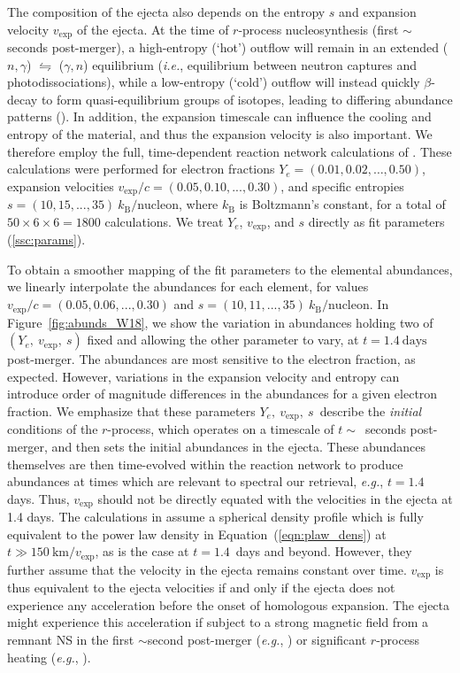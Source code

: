 \documentclass[twocolumn, twocolappendix]{aastex63}
\def\eg{{\it e.g.}}
\def\ie{{\it i.e.}}
\begin{document}
The composition of the ejecta also depends on the entropy $s$ and expansion velocity $v_{\mathrm{exp}}$ of the ejecta. At the time of $r$-process nucleosynthesis (first $\sim$ seconds post-merger), a high-entropy (`hot') outflow will remain in an extended ($n, \gamma$) $\leftrightharpoons$ ($\gamma, n$) equilibrium (\ie, equilibrium between neutron captures and photodissociations), while a low-entropy (`cold') outflow will instead quickly $\beta$-decay to form quasi-equilibrium groups of isotopes, leading to differing abundance patterns (\citealt{cowan21, vassh21}). In addition, the expansion timescale can influence the cooling and entropy of the material, and thus the expansion velocity is also important. We therefore employ the full, time-dependent reaction network calculations of \cite{wanajo18}. These calculations were performed for electron fractions $Y_e = (0.01, 0.02, \ldots, 0.50)$, expansion velocities $v_{\mathrm{exp}}/c = (0.05, 0.10, ..., 0.30)$, and specific entropies $s = (10, 15, ..., 35)~k_{\mathrm{B}}/\mathrm{nucleon}$, where $k_{\mathrm{B}}$ is Boltzmann's constant, for a total of $50 \times 6 \times 6 = 1800$ calculations. We treat $Y_e$, $v_{\mathrm{exp}}$, and $s$ directly as fit parameters (\ref{ssc:params}).

To obtain a smoother mapping of the fit parameters to the elemental abundances, we linearly interpolate the abundances for each element, for values $v_{\mathrm{exp}}/c = (0.05, 0.06, ..., 0.30)$ and $s = (10, 11, ..., 35)~k_{\mathrm{B}}/\mathrm{nucleon}$. In Figure~\ref{fig:abunds_W18}, we show the variation in abundances holding two of $(Y_e,~v_{\mathrm{exp}},~s)$ fixed and allowing the other parameter to vary, at $t = 1.4~\mathrm{days}$ post-merger. The abundances are most sensitive to the electron fraction, as expected. However, variations in the expansion velocity and entropy can introduce order of magnitude differences in the abundances for a given electron fraction. We emphasize that these parameters $Y_e,~v_{\mathrm{exp}},~s$~describe the \textit{initial} conditions of the $r$-process, which operates on a timescale of $t \sim$~seconds post-merger, and then sets the initial abundances in the ejecta. These abundances themselves are then time-evolved within the reaction network to produce abundances at times which are relevant to spectral our retrieval, \eg, $t = 1.4$ days. Thus, $v_{\mathrm{exp}}$ should not be directly equated with the velocities in the ejecta at 1.4 days. The calculations in \cite{wanajo18} assume a spherical density profile which is fully equivalent to the power law density in Equation~(\ref{eqn:plaw_dens}) at $t \gg 150~\mathrm{km} / v_{\mathrm{exp}}$, as is the case at $t = 1.4$~days and beyond. However, they further assume that the velocity in the ejecta remains constant over time. $v_{\mathrm{exp}}$ is thus equivalent to the ejecta velocities if and only if the ejecta does not experience any acceleration before the onset of homologous expansion. The ejecta might experience this acceleration if subject to a strong magnetic field from a remnant NS in the first $\sim$second post-merger (\eg, \citealt{metzger18}) or significant $r$-process heating (\eg, \citealt{klion22}). 
\end{document}

